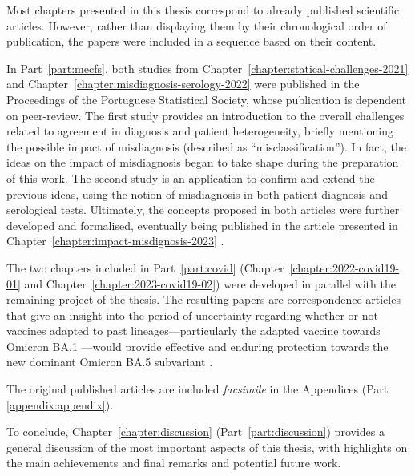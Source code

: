 Most chapters presented in this thesis correspond to already published scientific articles.
However, rather than displaying them by their chronological order of publication, the papers were included in a sequence based on their content.

In Part~\ref{part:mecfs}, both studies from Chapter~\ref{chapter:statical-challenges-2021} \citep{malato2021Statisticalchallenges} and Chapter~\ref{chapter:misdiagnosis-serology-2022} \citep{malato2022ImpactMisclassification} were published in the Proceedings of the Portuguese Statistical Society, whose publication is dependent on peer-review.
The first study provides an introduction to the overall challenges related to agreement in \cfs diagnosis and patient heterogeneity, briefly mentioning the possible impact of misdiagnosis (described as ``misclassification'').
In fact, the ideas on the impact of misdiagnosis began to take shape during the preparation of this work.
The second study is an application to confirm and extend the previous ideas, using the notion of misdiagnosis in both patient diagnosis and serological tests.
Ultimately, the concepts proposed in both articles were further developed and formalised, eventually being published in the article presented in Chapter~\ref{chapter:impact-misdignosis-2023} \citep{malato2023ImpactMisdiagnosis}.

The two chapters included in Part~\ref{part:covid} (Chapter~\ref{chapter:2022-covid19-01} and Chapter~\ref{chapter:2023-covid19-02}) were developed in parallel with the remaining project of the thesis.
The resulting papers are correspondence articles that give an insight into the period of uncertainty regarding whether or not vaccines adapted to past lineages---particularly the adapted vaccine towards Omicron BA.1%
---would provide effective and enduring protection towards the new dominant Omicron BA.5 subvariant \citep{malatoRiskBAInfection2022, malato2023StabilityHybrida}.

The original published articles are included \textit{facsimile} in the Appendices (Part \ref{appendix:appendix}).

To conclude, Chapter~\ref{chapter:discussion} (Part~\ref{part:discussion}) provides a general discussion of the most important aspects of this thesis, with highlights on the main achievements and final remarks and potential future work.




